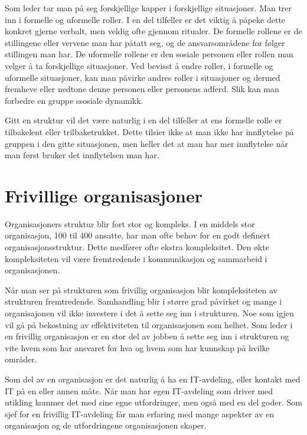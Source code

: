 \documentclass[12pt, a4paper]{article}
\begin{document}
Som leder tar man på seg forskjellige kapper i forskjellige situasjoner. Man
trer inn i formelle og uformelle roller. I en del tilfeller er det viktig å
påpeke dette konkret gjerne verbalt, men veldig ofte gjennom ritualer. De
formelle rollene er de stillingene eller vervene man har påtatt seg, og de
ansvarsområdene for følger stillingen man har. De uformelle rollene er den
sosiale personen eller rollen man velger å ta forskjellige situasjoner. Ved
bevisst å endre roller, i formelle og uformelle situasjoner, kan man påvirke
andres roller i situasjoner og dermed fremheve eller nedtone denne personen
eller personens adferd. Slik kan man forbedre en gruppe ssosiale dynamikk. 

Gitt en struktur vil det være naturlig i en del tilfeller at ens formelle rolle
er tilbakelent eller trilbaketrukket. Dette tilsier ikke at man ikke har
innflytelse på gruppen i den gitte situasjonen, men heller det at man har mer
innflytelse når man først bruker det innflytelsen man har. \cite[]{teamet} 

\section{Frivillige organisasjoner}

Organisasjoners struktur blir fort stor og kompleks. I en middels stor
organisasjon, 100 til 400 ansatte, har man ofte behov for en godt definert
organisasjonsstruktur. Dette medfører ofte ekstra kompleksitet. Den økte
kompleksiteten vil være fremtredende i kommunikasjon og sammarbeid i
organisasjonen.

Når man ser på strukturen som frivillig organisasjon blir kompleksiteten av
strukturen fremtredende. Samhandling blir i større grad påvirket og mange i
organisajonen vil ikke investere i det å sette seg inn i strukturen. Noe som
igjen vil gå på bekostning av effektiviteten til organisasjonen som helhet. 
Som leder i en frivillig organisasjon er en stor del av jobben å sette seg inn
i strukturen og vite hvem som har ansvaret for hva og hvem som har kunnskap på
hvilke områder. 

Som del av en organisasjon er det naturlig å ha en IT-avdeling, eller kontakt
med IT på en eller annen måte. Når man har egen IT-avdeling som driver med
utikling kommer det med sine egne utfordringer, men også med en del goder.
Som sjef for en frivillig IT-avdeling får man erfaring med mange aspekter av
en organisasjon og de utfordringene organisasjonen skaper. 
\end{document}
